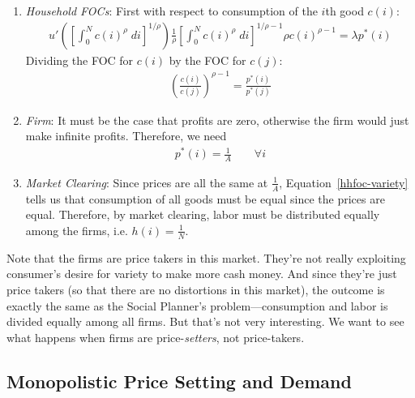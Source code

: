 \documentclass[12pt]{article}
\theoremstyle{plain}
\theoremstyle{definition}
\theoremstyle{remark}
\begin{document}
\begin{enumerate}
  \item \emph{Household FOCs}: First with respect to consumption of the
    $i$th good $c(i)$:
    \begin{align*}
      u'\left(
        \left[ \int_0^N c(i)^\rho \; di \right]^{1/\rho}
      \right)
      \frac{1}{\rho}
      \left[ \int_0^N c(i)^\rho \; di \right]^{1/\rho-1}
      \rho c(i)^{\rho-1}
      = \lambda p^*(i)
    \end{align*}
    Dividing the FOC for $c(i)$ by the FOC for $c(j)$:
    \begin{align}
      \left(
      \frac{c(i)}{c(j)}
      \right)^{\rho-1}
      =
      \frac{p^*(i)}{p^*(j)}
      \label{hhfoc-variety}
    \end{align}

  \item \emph{Firm}: It must be the case that profits are zero,
    otherwise the firm would just make infinite profits. Therefore, we
    need
    \begin{align*}
      p^*(i) = \frac{1}{A}
      \qquad \forall i
    \end{align*}

  \item \emph{Market Clearing}: Since prices are all the same at
    $\frac{1}{A}$, Equation~\ref{hhfoc-variety} tells us that
    consumption of all goods must be equal since the prices are equal.
    Therefore, by market clearing, labor must be distributed equally
    among the firms, i.e. $h(i) = \frac{1}{N}$.
\end{enumerate}
Note that the firms are price takers in this market. They're not really
exploiting consumer's desire for variety to make more cash money.  And
since they're just price takers (so that there are no distortions in
this market), the outcome is exactly the same as the Social Planner's
problem---consumption and labor is divided equally among all firms. But
that's not very interesting. We want to see what happens when firms are
price-\emph{setters}, not price-takers.


\subsection{Monopolistic Price Setting and Demand}
\end{document}
